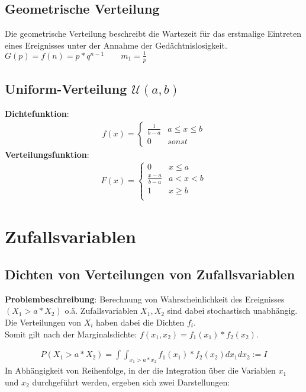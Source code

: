 \documentclass{article}
\begin{document}
\subsection{Geometrische Verteilung}
Die geometrische Verteilung beschreibt die Wartezeit für das erstmalige Eintreten
eines Ereignisses unter der Annahme der Ged\"achtnislosigkeit. \\
$G(p) = f(n) = p*q^{n-1} \quad \quad m_1 = \frac{1}{p}$
\subsection{Uniform-Verteilung $\mathcal{U}(a,b)$}
\textbf{Dichtefunktion}:
\begin{align} f(x) =
	\begin{cases}
		\frac{1}{b - a} & a \leq x \leq b \\
		0               &  sonst
	\end{cases}
\end{align}
\textbf{Verteilungsfunktion}:
\begin{align} F(x) =
	\begin{cases}
		0     & x \leq a\\
		\frac{x - a}{b - a} & a < x < b \\
		1     & x \geq b\\
	\end{cases}
\end{align}

\section{Zufallsvariablen}
\subsection{Dichten von Verteilungen von Zufallsvariablen}
\textbf{Problembeschreibung}: Berechnung von Wahrscheinlichkeit des
Ereignisses $(X_1 > a * X_2)$ o.\"a.
Zufallsvariablen $X_1, X_2$  sind dabei stochastisch
unabh\"angig. Die Verteilungen von $X_i$ haben dabei die Dichten
$f_i$.\\
Somit gilt nach der Marginalsdichte: $f(x_1,x_2) = f_1(x_1)*f_2(x_2)$.

\begin{align}
	P(X_1 > a * X_2) = \int \int_{x_1>a*x_2} f_1(x_1)*f_2(x_2) dx_1dx_2 := I
\end{align}
In Abh\"angigkeit von Reihenfolge, in der die Integration \"uber die Variablen
$x_1$ und $x_2$ durchgef\"uhrt werden, ergeben sich zwei Darstellungen:
\end{document}
